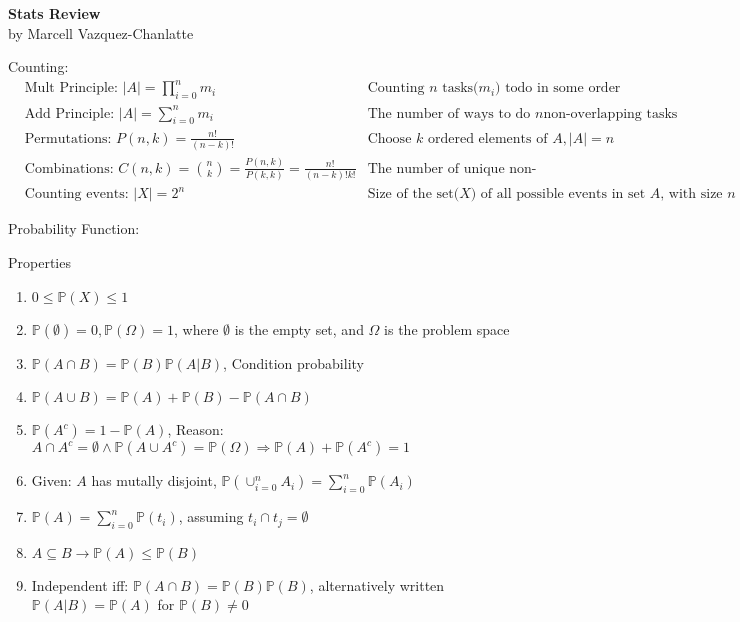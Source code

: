 \documentclass[12pt]{article}
\newcommand{\abs}[1]{\left| #1 \right|} %
\renewcommand{\=}[1]{\stackrel{#1}{=}} %
\theoremstyle{definition}
\theoremstyle{remark}
\begin{document}
\begin{center}
  {\LARGE
    \textbf{Stats Review}\\
    \normalsize
    \textnormal {by Marcell Vazquez-Chanlatte}
    \\[1ex]}

  
\end{center}

Counting:
\begin{align*}
  & \textrm{Mult Principle:  } \abs{A}= \displaystyle\prod_{i = 0}^{n}
  m_i & \textrm{Counting $n$ tasks($m_i$) todo in some
    order}\\
  & \textrm{Add Principle: } \abs{A} = \sum_{i=0}^n m_i & \textrm{The number of ways to do $n$
    non-overlapping tasks}\\
  & \textrm{Permutations: } P(n,k) = \frac{n!}{(n-k)!} & \textrm{Choose $k$ ordered elements of $A, \abs{A}=
    n$} \\
  & \textrm{Combinations: }
  C(n,k) = \binom{n}{k} = \frac{P(n,k)}{P(k,k)} =
  \frac{n!}{(n-k)!k!} & \textrm{The number of unique non-ordered
    lists}\\
  & \textrm{Counting events: } \abs{X} =
  2^n & \textrm{Size of the set($X$) of all possible events in set
    $A$, with size $n$}
\end{align*}

\begin{description}
\item Probability Function:
\item Properties
  \begin{enumerate}
  \item $0 \leq \mathbb{P}(X) \leq 1$
  \item $\mathbb{P}(\emptyset) = 0, \mathbb{P}(\Omega)=1$, where
    $\emptyset$ is the empty set, and $\Omega$ is the problem space
  \item $\mathbb{P}(A\cap B) = \mathbb{P}(B)\mathbb{P}(A | B)$,
    Condition probability
  \item $\mathbb{P}(A\cup B) = \mathbb{P}(A) + \mathbb{P}(B) -
    \mathbb{P}(A\cap B)$
  \item $\mathbb{P}(A^c) = 1-\mathbb{P}(A)$, Reason: $A\cap A^c =
    \emptyset \wedge \mathbb{P}(A\cup A^c) = \mathbb{P}(\Omega)
    \Rightarrow \mathbb{P}(A)+\mathbb{P}(A^c) = 1$
  \item Given: $A$ has mutally disjoint, $\mathbb{P}(\cup_{i=0}^n
    A_i) = \sum_{i=0}^n\mathbb{P}(A_i) $
  \item $\mathbb{P}(A)=\sum_{i=0}^n\mathbb{P}({t_i})$, assuming ${t_i}\cap {t_j} = \emptyset$
  \item $A\subseteq B \rightarrow \mathbb{P}(A)\leq \mathbb{P}(B)$
  \item Independent iff: $\mathbb{P}(A\cap B) =
    \mathbb{P}(B)\mathbb{P}(B)$, alternatively written
    $\mathbb{P}(A|B) = \mathbb{P}(A)$ for $\mathbb{P}(B) \neq 0$ 
  \end{enumerate}
\end{description}
\end{document}
